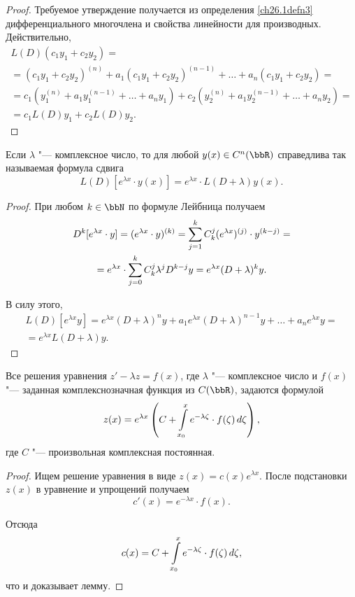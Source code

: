 \begin{proof}
Требуемое утверждение получается из определения \ref{ch26.1defn3} дифференциального многочлена и свойства линейности для производных. Действительно,
\begin{multline*}
L(D)(c_1y_1+c_2y_2)=\\=(c_1y_1+c_2y_2)^{(n)}+a_1(c_1y_1+c_2y_2)^{(n-1)}+\dots+a_n(c_1y_1+c_2y_2)=\\=c_1(y_1^{(n)}+a_1y_1^{(n-1)}+\dots+a_ny_1)+c_2(y_2^{(n)}+a_1y_2^{(n-1)}+\dots+a_ny_2)=\\=c_1L(D)y_1+c_2L(D)y_2. \tag*{\qedhere}
\end{multline*}
\end{proof}

\begin{lemm} \label{ch26lemm1.2}
Если $\lambda$ "--- комплексное число, то для любой $y(x)\in C^n(\bbR)$ справедлива так называемая формула сдвига
$$
L(D)\left[e^{\lambda x}\cdot y(x)\right]=e^{\lambda x}\cdot L(D+\lambda)y(x).
$$
\end{lemm}
\begin{proof}
При любом $k\in \bbN$ по формуле Лейбница получаем
\begin{multline*}
D^k[e^{\lambda x}\cdot y]=(e^{\lambda x}\cdot y)^{(k)}=\sum_{j=1}^{k}\limits C_k^j(e^{\lambda x})^{(j)}\cdot y^{(k-j)}=\\=e^{\lambda x}\cdot \sum_{j=0}^{k}\limits C_k^j\lambda^jD^{k-j}y=e^{\lambda x}(D+\lambda)^ky.
\end{multline*}

В силу этого,
\begin{multline*}
L(D)[e^{\lambda x}y]=e^{\lambda x}(D+\lambda)^ny+a_1e^{\lambda x}(D+\lambda)^{n-1}y+\dots+a_ne^{\lambda x}y=\\=e^{\lambda x}L(D+\lambda)y.\tag*{\qedhere}
\end{multline*}
\end{proof}

\begin{lemm} \label{ch26lemm1.3}
Все решения уравнения $z'-\lambda z = f(x)$, где $\lambda$ "--- комплексное число и $f(x)$ "--- заданная комплекснозначная функция из $C(\bbR)$, задаются формулой	
$$
z(x)=e^{\lambda x}\left(C+ \int_{x_0}^{x}\limits e^{-\lambda\zeta}\cdot f(\zeta)\,d\zeta\right),
$$
где $C$ "--- произвольная комплексная постоянная. 
\end{lemm}

\begin{proof}
Ищем решение уравнения в виде $z(x)=c(x)e^{\lambda x}$. После подстановки $z(x)$ в уравнение и упрощений получаем 
$$
c'(x)=e^{-\lambda x}\cdot f(x).
$$

Отсюда
$$
c(x)=C+\int_{x_0}^{x}\limits e^{-\lambda\zeta}\cdot f(\zeta)\,d\zeta,
$$
что и доказывает лемму.
\end{proof}

